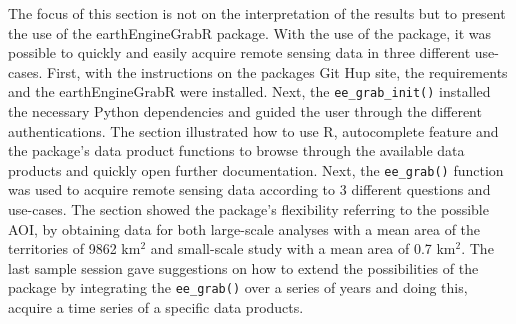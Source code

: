 The focus of this section is not on the interpretation of the results but to present the use of the earthEngineGrabR package.
With the use of the package, it was possible to quickly and easily acquire remote sensing data in three different use-cases. First, with the instructions on the packages Git Hup site, the requirements and the earthEngineGrabR were installed. Next, the \texttt{ee\_grab\_init()} installed the necessary Python dependencies and guided the user through the different authentications. The section illustrated how to use R, autocomplete feature and the package's data product functions to browse through the available data products and quickly open further documentation. Next, the \texttt{ee\_grab()} function was used to acquire remote sensing data according to 3 different questions and use-cases. The section showed the package's flexibility referring to the possible AOI, by obtaining data for both large-scale analyses with a mean area of the territories of 9862 km$^2$ and small-scale study with a mean area of 0.7 km$^2$.
The last sample session gave suggestions on how to extend the possibilities of the package by integrating the \texttt{ee\_grab()} over a series of years and doing this, acquire a time series of a specific data products.







